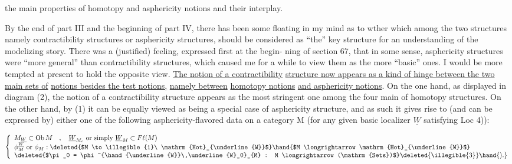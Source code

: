 
the main properties of homotopy  and asphericity notions and their
interplay.

By the end of part III and the beginning of part IV, there has
been some floating in my mind as to wther which among the two structures\hand{,}
namely contractibility structures or asphericity structures, should be
considered as ``the'' key structure for an understanding of the modelizing
story. There was a (justified) feeling, expressed first at the begin-%
ning of section 67, that in some sense, asphericity structures were
``more general'' than contractibility structures, which caused me for a
while to view them as the more ``basic'' ones. I would be more tempted at
present to hold the opposite view. \uline{The notion of a contractibility}
\uline{structure now appears as a kind of hinge between the two main sets of}
\uline{notions besides the test notions,} \uline{namely between}  \uline{homotopy notions}
\uline{and asphericity notions}. On the one hand, as displayed in diagram (2),
the notion of a contractibility structure  appears as the most
stringent one among the four main  of homotopy  structures.
On the other hand, by (1) it can be equally viewed as being a special
case of  asphericity structure, and as such it  gives
rise to (and can be expressed by) either one of the following  
asphericity-flavored data on a category M (for any given basic localizer
$\underline{W}$ satisfying Loc 4)):

 
\[
\left\{
\begin{array}{l}
M_{\underline{W}} \subset \mathrm{Ob}\,M \quad , \quad \underline{W}_{M_c} \text{ or simply } \underline{W}_M \subset F\ell(M)\\
\phi^{\underline{W}}_{M} \text{ or } \phi_M : \deleted{$M \to \illegible{1}\ \mathrm{Hot}_{\underline{W}}$} \hand{$M \longrightarrow \mathrm{Hot}_{\underline{W}}$}\\
\deleted{$\pi_0 = \phi^{\hand{\underline{W}}\,\underline{W}_0}_{M} : M \longrightarrow (\mathrm{Sets})$} \deleted{\illegible{3}} \hand{).}
\end{array}
\right.
\]

